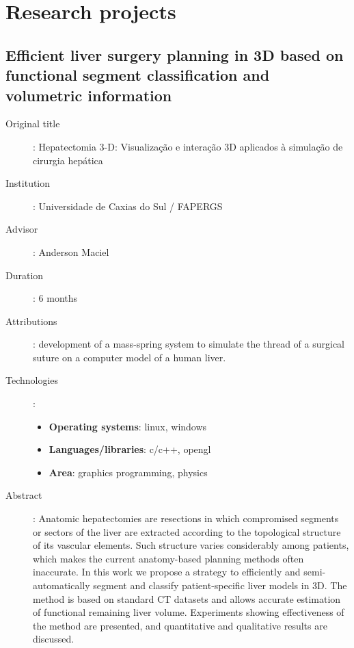 \section*{Research projects}

\subsection*{
    Efficient liver surgery planning in 3D based on functional segment
    classification and volumetric information}

\begin{description}
    \item[Original title]:
        Hepatectomia 3-D: Visualização e interação 3D aplicados à simulação de
        cirurgia hepática
    \item[Institution]: Universidade de Caxias do Sul / FAPERGS
    \item[Advisor]: Anderson Maciel
    \item[Duration]: 6 months
    \item[Attributions]:
        development of a mass-spring system to simulate the thread of a
        surgical suture on a computer model of a human liver.
    \item[Technologies]:
        \begin{itemize}
            \item \textbf{Operating systems}: linux, windows
            \item \textbf{Languages/libraries}: c/c++, opengl
            \item \textbf{Area}: graphics programming, physics
        \end{itemize}
    \item[Abstract]:
        Anatomic hepatectomies are resections in which compromised segments or
        sectors of the liver are extracted according to the topological
        structure of its vascular elements. Such structure varies considerably
        among patients, which makes the current anatomy-based planning methods
        often inaccurate. In this work we propose a strategy to efficiently and
        semi-automatically segment and classify patient-specific liver models
        in 3D. The method is based on standard CT datasets and allows accurate
        estimation of functional remaining liver volume. Experiments showing
        effectiveness of the method are presented, and quantitative and
        qualitative results are discussed.
\end{description}

